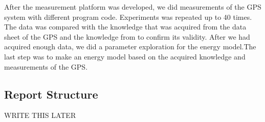 After the measurement platform was developed, we did measurements of the GPS system with different program code. Experiments was repeated up to 40 times. The data was compared with the knowledge that was acquired from the data sheet of the GPS and the knowledge from \cite{GPS} to confirm its validity. After we had acquired enough data, we did a parameter exploration for the energy model.The last step was to make an energy model based on the acquired knowledge and measurements of the GPS. 



\subsection{Report Structure}

WRITE THIS LATER 


\newpage
